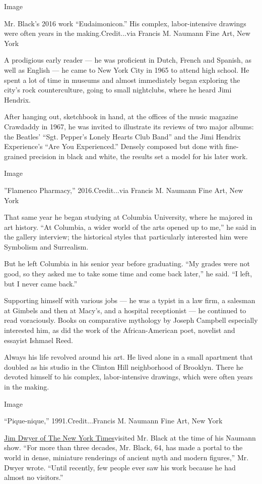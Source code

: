 Image

Mr. Black's 2016 work ``Eudaimonicon.'' His complex, labor-intensive
drawings were often years in the making.Credit...via Francis M. Naumann
Fine Art, New York

A prodigious early reader --- he was proficient in Dutch, French and
Spanish, as well as English --- he came to New York City in 1965 to
attend high school. He spent a lot of time in museums and almost
immediately began exploring the city's rock counterculture, going to
small nightclubs, where he heard Jimi Hendrix.

After hanging out, sketchbook in hand, at the offices of the music
magazine Crawdaddy in 1967, he was invited to illustrate its reviews of
two major albums: the Beatles' ``Sgt. Pepper's Lonely Hearts Club Band''
and the Jimi Hendrix Experience's ``Are You Experienced.'' Densely
composed but done with fine-grained precision in black and white, the
results set a model for his later work.

Image

''Flamenco Pharmacy,'' 2016.Credit...via Francis M. Naumann Fine Art,
New York

That same year he began studying at Columbia University, where he
majored in art history. ``At Columbia, a wider world of the arts opened
up to me,'' he said in the gallery interview; the historical styles that
particularly interested him were Symbolism and Surrealism.

But he left Columbia in his senior year before graduating. ``My grades
were not good, so they asked me to take some time and come back later,''
he said. ``I left, but I never came back.''

Supporting himself with various jobs --- he was a typist in a law firm,
a salesman at Gimbels and then at Macy's, and a hospital receptionist
--- he continued to read voraciously. Books on comparative mythology by
Joseph Campbell especially interested him, as did the work of the
African-American poet, novelist and essayist Ishmael Reed.

Always his life revolved around his art. He lived alone in a small
apartment that doubled as his studio in the Clinton Hill neighborhood of
Brooklyn. There he devoted himself to his complex, labor-intensive
drawings, which were often years in the making.

Image

``Pique-nique,'' 1991.Credit...Francis M. Naumann Fine Art, New York

\href{https://www.nytimes3xbfgragh.onion/2013/06/05/nyregion/discovered-at-64-a-brooklyn-artist-takes-his-place.html}{Jim
Dwyer of The New York Times}visited Mr. Black at the time of his Naumann
show. ``For more than three decades, Mr. Black, 64, has made a portal to
the world in dense, miniature renderings of ancient myth and modern
figures,'' Mr. Dwyer wrote. ``Until recently, few people ever saw his
work because he had almost no visitors.''

